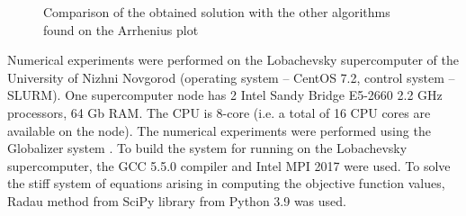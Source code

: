 \documentclass{svproc}
\begin{document}
\begin{figure}[ht]
	\caption{Comparison of the obtained solution with the other algorithms found on the Arrhenius plot}
	\label{fig_arren}
\end{figure}


Numerical experiments were performed on the Lobachevsky supercomputer of the University of Nizhni Novgorod (operating system -- CentOS 7.2, control system -- SLURM). One supercomputer node has 2 Intel Sandy Bridge E5-2660 2.2 GHz processors, 64 Gb RAM. The CPU is 8-core (i.e. a total of 16 CPU cores are available on the node). The numerical experiments were performed using the Globalizer system \cite{globalizerSystem}.
To build the system for running on the Lobachevsky supercomputer, the GCC 5.5.0 compiler and Intel MPI 2017 were used.
To solve the stiff system of equations arising in computing the objective function values, Radau method from SciPy library from Python 3.9 was used.

\end{document}
